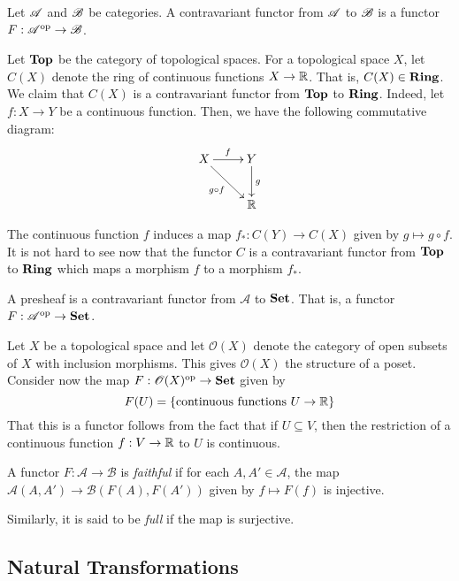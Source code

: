 \begin{definition}
    Let $\mathscr{A}$ and $\mathscr{B}$ be categories. A contravariant functor from $\mathscr{A}$ to $\mathscr{B}$ is a functor $F:\mathscr{A}^{\text{op}}\to\mathscr{B}$.
\end{definition}

Let $\mathbf{Top}$ be the category of topological spaces. For a topological space $X$, let $C(X)$ denote the ring of continuous functions $X\to\mathbb{R}$. That is, $C(X)\in\mathbf{Ring}$. We claim that $C(X)$ is a contravariant functor from $\mathbf{Top}$ to $\mathbf{Ring}$. Indeed, let $f: X\to Y$ be a continuous function. Then, we have the following commutative diagram: 
\begin{equation*}
\xymatrix {
    X\ar[r]^f\ar[rd]_{g\circ f} & Y\ar[d]^g\\
    & \R
}
\end{equation*}

The continuous function $f$ induces a map $f_*: C(Y)\to C(X)$ given by $g\mapsto g\circ f$. It is not hard to see now that the functor $C$ is a contravariant functor from $\mathbf{Top}$ to $\mathbf{Ring}$ which maps a morphism $f$ to a morphism $f_*$.


\begin{definition}[Presheaf]
    A presheaf is a contravariant functor from $\mathscr A$ to $\mathbf{Set}$. That is, a functor $F:\mathscr{A}^{\text{op}}\to\mathbf{Set}$.
\end{definition}

Let $X$ be a topological space and let $\mathscr O(X)$ denote the category of open subsets of $X$ with inclusion morphisms. This gives $\mathscr O(X)$ the structure of a poset. Consider now the map $F:\mathscr O(X)^{\text{op}}\to\mathbf{Set}$ given by 
\begin{equation*}
    F(U) = \left\{\text{continuous functions }U\to\mathbb{R}\right\}
\end{equation*}
That this is a functor follows from the fact that if $U\subseteq V$, then the restriction of a continuous function $f: V\to\mathbb{R}$ to $U$ is continuous.

\begin{definition}
    A functor $F:\mathscr A\to\mathscr B$ is \textit{faithful} if for each $A,A'\in\mathscr A$, the map $\mathscr A(A,A')\to\mathscr B(F(A),F(A'))$ given by $f\mapsto F(f)$ is injective.

    Similarly, it is said to be \textit{full} if the map is surjective.
\end{definition}

\subsection{Natural Transformations}

